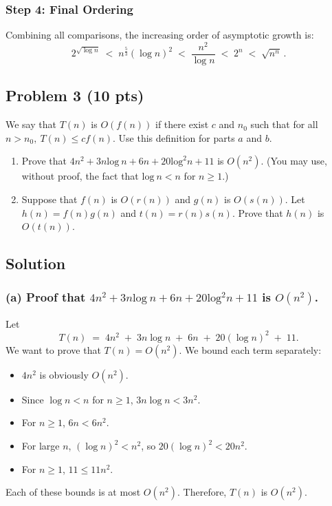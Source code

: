\documentclass[12pt]{article}
\begin{document}
\subsubsection*{Step 4: Final Ordering}
Combining all comparisons, the increasing order of asymptotic growth is:
\[
\boxed{
2^{\sqrt{\log n}} 
\;<\; 
n^{\tfrac{5}{3}} (\log n)^2 
\;<\; 
\frac{n^2}{\log n} 
\;<\; 
2^n 
\;<\; 
\sqrt{n^n}\,.
}
\]

\subsection*{Problem 3 (10 pts)}
We say that $T(n)$ is $O(f(n))$ if there exist $c$ and $n_0$ such that for all $n > n_0,\:T(n) \le cf(n)$. Use this definition for parts $a$ and $b$.
\begin{enumerate}
    \item Prove that $4n^2 + 3n\text{log}\:n + 6n + 20\text{log}^2n + 11$ is $O(n^2)$. (You may use, without proof, the fact that $\text{log}\:n < n$ for $n \ge 1$.)
    \item Suppose that $f(n)$ is $O(r(n))$ and $g(n)$ is $O(s(n))$. Let $h(n) = f(n)g(n)$ and $t(n) = r(n)s(n)$. Prove that $h(n)$ is $O(t(n))$.
\end{enumerate}

\subsection*{Solution}

\subsubsection*{(a) Proof that $4n^2 + 3n\text{log}\:n + 6n + 20\text{log}^2n + 11$ is $O(n^2)$.}

Let
\[
T(n) \;=\; 4n^2 \;+\; 3n \log n \;+\; 6n \;+\; 20 (\log n)^2 \;+\; 11.
\]
We want to prove that $T(n) = O(n^2)$. We bound each term separately:
\begin{itemize}
\item $4n^2$ is obviously $O(n^2)$.
\item Since $\log n < n$ for $n \ge 1$, $3n \log n < 3n^2$.
\item For $n \ge 1$, $6n < 6n^2$.
\item For large $n$, $(\log n)^2 < n^2$, so $20(\log n)^2 < 20n^2$.
\item For $n \ge 1$, $11 \le 11n^2$.
\end{itemize}
Each of these bounds is at most $O(n^2)$.
Therefore, $T(n)$ is $O(n^2)$.
\end{document}
